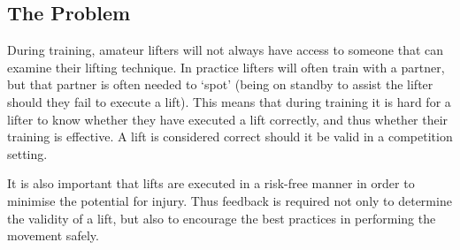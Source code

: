 \pagebreak
\subsection{The Problem}

During training, amateur lifters will not always have access to someone that can examine their lifting technique. In practice lifters will often train with a partner, but that partner is often needed to `spot' (being on standby to assist the lifter should they fail to execute a lift). This means that during training it is hard for a lifter to know whether they have executed a lift correctly, and thus whether their training is effective. A lift is considered correct should it be valid in a competition setting.

It is also important that lifts are executed in a risk-free manner in order to minimise the potential for injury. Thus feedback is required not only to determine the validity of a lift, but also to encourage the best practices in performing the movement safely.